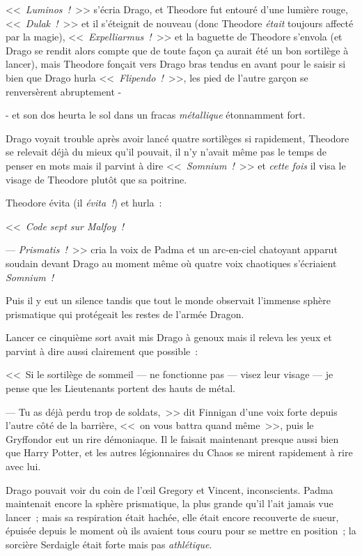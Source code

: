 <<~\emph{Luminos~!}~>> s'écria Drago, et Theodore fut entouré d'une lumière rouge, <<~\emph{Dulak~!}~>> et il s'éteignit de nouveau (donc Theodore \emph{était} toujours affecté par la magie), <<~\emph{Expelliarmus~!}~>> et la baguette de Theodore s'envola (et Drago se rendit alors compte que de toute façon ça aurait été un bon sortilège à lancer), mais Theodore fonçait vers Drago bras tendus en avant pour le saisir si bien que Drago hurla <<~\emph{Flipendo~!}~>>, les pied de l'autre garçon se renversèrent abruptement -

- et son dos heurta le sol dans un fracas \emph{métallique} étonnamment fort.

Drago voyait trouble après avoir lancé quatre sortilèges si rapidement, Theodore se relevait déjà du mieux qu'il pouvait, il n'y n'avait même pas le temps de penser en mots mais il parvint à dire <<~\emph{Somnium~!}~>> et \emph{cette fois} il visa le visage de Theodore plutôt que sa poitrine.

Theodore évita (il \emph{évita~!}) et hurla~:

<<~\emph{Code sept sur Malfoy~!}

--- \emph{Prismatis~!}~>> cria la voix de Padma et un arc-en-ciel chatoyant apparut soudain devant Drago au moment même où quatre voix chaotiques s'écriaient \emph{Somnium~!}

Puis il y eut un silence tandis que tout le monde observait l'immense sphère prismatique qui protégeait les restes de l'armée Dragon.

Lancer ce cinquième sort avait mis Drago à genoux mais il releva les yeux et parvint à dire aussi clairement que possible~:

<<~Si le sortilège de sommeil — ne fonctionne pas — visez leur visage — je pense que les Lieutenants portent des hauts de métal.

--- Tu as déjà perdu trop de soldats,~>> dit Finnigan d'une voix forte depuis l'autre côté de la barrière, <<~on vous battra quand même~>>, puis le Gryffondor eut un rire démoniaque. Il le faisait maintenant presque aussi bien que Harry Potter, et les autres légionnaires du Chaos se mirent rapidement à rire avec lui.

Drago pouvait voir du coin de l'œil Gregory et Vincent, inconscients. Padma maintenait encore la sphère prismatique, la plus grande qu'il l'ait jamais vue lancer~; mais sa respiration était hachée, elle était encore recouverte de sueur, épuisée depuis le moment où ils avaient tous couru pour se mettre en position~; la sorcière Serdaigle était forte mais pas \emph{athlétique}.

